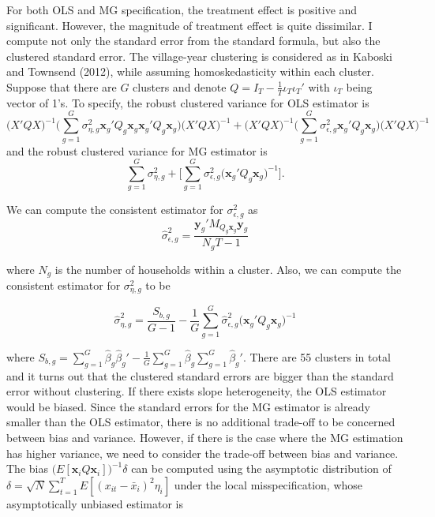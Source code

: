 For both OLS and MG specification, the treatment effect is positive and significant. However, the magnitude of treatment effect is quite dissimilar. I compute not only the standard error from the standard formula, but also the clustered standard error. The village-year clustering is considered as in Kaboski and Townsend (2012), while assuming homoskedasticity within each cluster. Suppose that there are $G$ clusters and denote $Q = I_T - \frac{1}{T} \iota_T \iota_T'$ with $\iota_T$ being vector of 1's. To specify, the robust clustered variance for OLS estimator is
\[
\big ( X'QX\big)^{-1} \big( \sum_{g=1}^{G} \sigma_{\eta,g}^2 \mathbf{x}_g'Q_g\mathbf{x}_g \mathbf{x}_g'Q_g \mathbf{x}_g \big) \big ( X'QX\big)^{-1} + \big ( X'QX\big)^{-1} \big( \sum_{g=1}^{G} \sigma_{\epsilon,g}^2 \mathbf{x}_g'Q_g \mathbf{x}_g \big) \big ( X'QX\big)^{-1}
\]
and the robust clustered variance for MG estimator is
\[
  \sum_{g=1}^{G} \sigma_{\eta,g}^2  +  \bigg [ \sum_{g=1}^{G} \sigma_{\epsilon,g}^2\big( \mathbf{x}_g'Q_g \mathbf{x}_g \big)^{-1} \bigg ].
\]

We can compute the consistent estimator for $\sigma_{\epsilon,g}^2$ as
\[
\widehat{\sigma}_{\epsilon,g}^2 = \frac{\mathbf{y}_g'M_{Q_g\mathbf{x}_g}\mathbf{y}_g}{N_gT-1}
\]

where $N_g$ is the number of households within a cluster. Also, we can compute the consistent estimator for $\sigma_{\eta,g}^2$ to be

\[
\widehat{\sigma}_{\eta,g}^2 = \frac{S_{b,g}}{G-1} - \frac{1}{G} \sum_{g=1}^G \widehat{\sigma}_{\epsilon,g}^2 \big(\mathbf{x}_g' Q_g \mathbf{x}_g \big)^{-1}
\]

where $S_{b,g} = \sum_{g=1}^G \widehat{\beta}_g \widehat{\beta}_g' - \frac{1}{G} \sum_{g=1}^G \widehat{\beta}_g \sum_{g=1}^G \widehat{\beta}_g'$.
There are 55 clusters in total and it turns out that the clustered standard errors are bigger than the standard error without clustering. 
If there exists slope heterogeneity, the OLS estimator would be biased. 
Since the standard errors for the MG estimator is already smaller than the OLS estimator, there is no additional trade-off to be concerned between bias and variance. 
However, if there is the case where the MG estimation has higher variance, we need to consider the trade-off between bias and variance. 
The bias $\big(E[\mathbf{x}_iQ\mathbf{x}_i]\big)^{-1}\delta$ can be computed using the asymptotic distribution of $\delta = \sqrt{N}\sum_{t=1}^T E[(x_{it}-\bar{x}_i)^2\eta_i]$ under the local misspecification, whose asymptotically unbiased estimator is 

